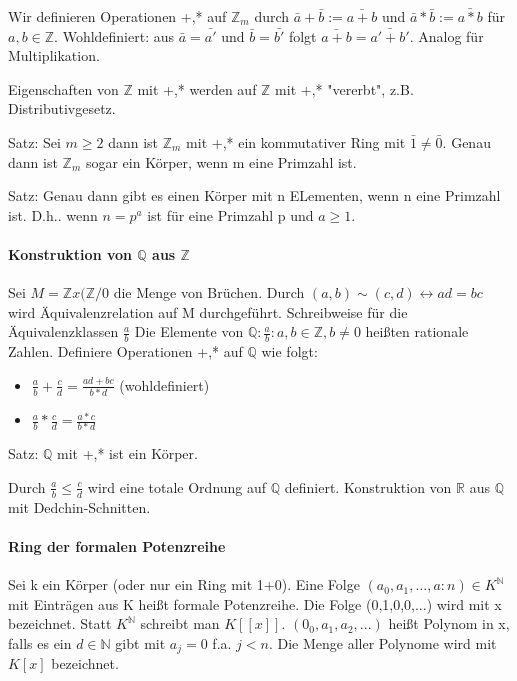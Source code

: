 \documentclass[10pt,landscape]{article}
\begin{document}
\begin{multicols}{3}
Wir definieren Operationen +,* auf $\mathbb{Z}_m$ durch $\bar{a}+\bar{b}:= \bar{a+b}$ und $\bar{a}*\bar{b}:=\bar{a*b}$ für $a,b\in \mathbb{Z}$. 
Wohldefiniert: aus $\bar{a}=\bar{a'}$ und $\bar{b}=\bar{b'}$ folgt $\bar{a+b}=\bar{a'+b'}$. Analog für Multiplikation.

Eigenschaften von $\mathbb{Z}$ mit +,* werden auf $\mathbb{Z}$ mit +,* "vererbt", z.B. Distributivgesetz.

Satz: Sei $m\geq 2$ dann ist $\mathbb{Z}_m$ mit +,* ein kommutativer Ring mit $\bar{1}\not=\bar{0}$. Genau dann ist $\mathbb{Z}_m$ sogar ein Körper, wenn m eine Primzahl ist.

Satz: Genau dann gibt es einen Körper mit n ELementen, wenn n eine Primzahl ist. D.h.. wenn $n=p^a$ ist für eine Primzahl p und $a\geq 1$.

\paragraph{Konstruktion von $\mathbb{Q}$ aus $\mathbb{Z}$}
Sei $M=\mathbb{Z} x(\mathbb{Z} /{0}$ die Menge von Brüchen. Durch $(a,b)\sim (c,d)\leftrightarrow ad=bc$ wird Äquivalenzrelation auf M durchgeführt. Schreibweise für die Äquivalenzklassen $\frac{a}{b}$ Die Elemente von $\mathbb{Q} :{\frac{a}{b}:a,b\in\mathbb{Z}, b\not=0}$ heißten rationale Zahlen.
Definiere Operationen +,* auf $\mathbb{Q}$ wie folgt:
\begin{itemize}
    \item $\frac{a}{b}+\frac{c}{d} = \frac{ad+bc}{b*d}$ (wohldefiniert)
    \item $\frac{a}{b}*\frac{c}{d} = \frac{a*c}{b*d}$
\end{itemize}

Satz: $\mathbb{Q}$ mit +,* ist ein Körper.

Durch $\frac{a}{b}\leq\frac{c}{d}$ wird eine totale Ordnung auf $\mathbb{Q}$ definiert. Konstruktion von $\mathbb{R}$ aus $\mathbb{Q}$ mit Dedchin-Schnitten.

\paragraph{Ring der formalen Potenzreihe}
Sei k ein Körper (oder nur ein Ring mit 1+0). Eine Folge $(a_0, a_1,...,a:n)\in K^{\mathbb{N}}$ mit Einträgen aus K heißt formale Potenzreihe. Die Folge (0,1,0,0,...) wird mit x bezeichnet. Statt $K^{\mathbb{N}}$ schreibt man $K[[x]]$. $(0_0,a_1,a_2,...)$ heißt Polynom in x, falls es ein $d\in \mathbb{N}$ gibt mit $a_j=0$ f.a. $j<n$. Die Menge aller Polynome wird mit $K[x]$ bezeichnet.


\end{multicols}
\end{document}
